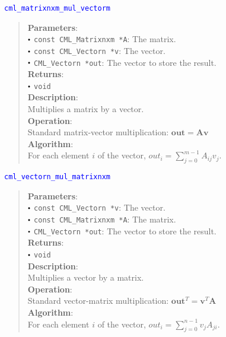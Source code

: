 \documentclass[a4paper,oneside,8pt]{extarticle}
\newcommand{\function}[1]{
  \noindent\textcolor{blue}{\texttt{#1}}
  \vspace{-0.3em}
}
\renewcommand{\dot}{\raisebox{0.3ex}{\scalebox{0.6}{$\bullet$}}}
\theoremstyle{definition}
\begin{document}
\function{cml\_matrixnxm\_mul\_vectorm}
\begin{quote}
  \textbf{Parameters}: \\
  $\dot$ \texttt{const CML\_Matrixnxm *A}: The matrix. \\
  $\dot$ \texttt{const CML\_Vectorn *v}: The vector. \\
  $\dot$ \texttt{CML\_Vectorn *out}: The vector to store the result. \\
  \textbf{Returns}: \\
  $\dot$ \texttt{void} \\

  \vspace{-0.75em}
  \textbf{Description}: \\
  Multiplies a matrix by a vector. \\

  \vspace{-0.75em}
  \textbf{Operation}: \\
  Standard matrix-vector multiplication: $\mathbf{out} = \mathbf{A}\mathbf{v}$ \\

  \vspace{-0.75em}
  \textbf{Algorithm}: \\
  For each element $i$ of the vector, $out_i = \sum_{j=0}^{m-1} A_{ij}v_j$. \\
\end{quote}

\function{cml\_vectorn\_mul\_matrixnxm}
\begin{quote}
  \textbf{Parameters}: \\
  $\dot$ \texttt{const CML\_Vectorn *v}: The vector. \\
  $\dot$ \texttt{const CML\_Matrixnxm *A}: The matrix. \\
  $\dot$ \texttt{CML\_Vectorn *out}: The vector to store the result. \\
  \textbf{Returns}: \\
  $\dot$ \texttt{void} \\

  \vspace{-0.75em}
  \textbf{Description}: \\
  Multiplies a vector by a matrix. \\

  \vspace{-0.75em}
  \textbf{Operation}: \\
  Standard vector-matrix multiplication: $\mathbf{out}^T = \mathbf{v}^T\mathbf{A}$ \\

  \vspace{-0.75em}
  \textbf{Algorithm}: \\
  For each element $i$ of the vector, $out_i = \sum_{j=0}^{n-1} v_jA_{ji}$. \\
\end{quote}
\end{document}
